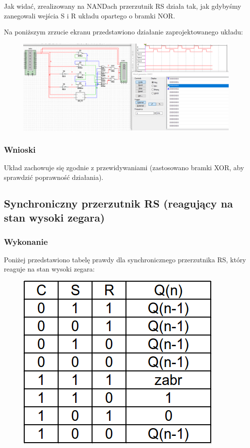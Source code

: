 \documentclass[12pt,a4paper]{article}
\begin{document}
Jak widać, zrealizowany na NANDach przerzutnik RS działa tak, jak gdybyśmy zanegowali wejścia S i R układu opartego o bramki NOR.

Na poniższym zrzucie ekranu przedstawiono działanie zaprojektowanego układu:

\begin{figure}[H]
\centering
\includegraphics[width=\textwidth]{img/3a}
\end{figure}

\subsubsection{Wnioski}

Układ zachowuje się zgodnie z przewidywaniami (zastosowano bramki XOR, aby sprawdzić poprawność działania).

\subsection{Synchroniczny przerzutnik RS (reagujący na stan wysoki zegara)}
\subsubsection{Wykonanie}

Poniżej przedstawiono tabelę prawdy dla synchronicznego przerzutnika RS, który reaguje na stan wysoki zegara:

\begin{figure}[H]
\centering
\includegraphics[scale=0.3]{img/3bTruthTable}
\end{figure}
\end{document}
